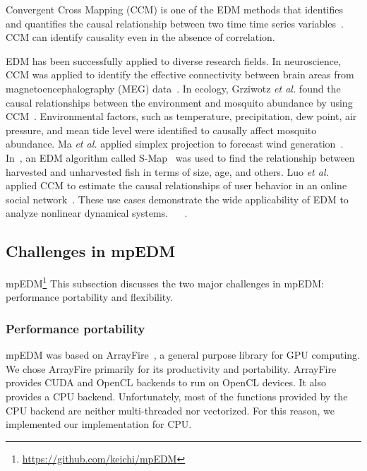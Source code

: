 \documentclass[conference]{IEEEtran}
\begin{document}
Convergent Cross Mapping (CCM) is one of the EDM methods that identifies and
quantifies the causal relationship between two time time series
variables~\cite{Sugihara2012}. CCM can identify causality even in the absence
of correlation.

EDM has been successfully applied to diverse research fields. In neuroscience,
CCM was applied to identify the effective connectivity between brain areas from
magnetoencephalography (MEG) data~\cite{Natsukawa2017}. In ecology, Grziwotz
\emph{et al.} found the causal relationships between the environment and
mosquito abundance by using CCM~\cite{grziwotz2018empirical}. Environmental
factors, such as temperature, precipitation, dew point, air pressure, and mean
tide level were identified to causally affect mosquito abundance. Ma \emph{et
al.} applied simplex projection to forecast wind generation~\cite{ma2017ultra}.
In~\cite{anderson2008fishing}, an EDM algorithm called
S-Map~\cite{sugihara1994nonlinear} was used to find the relationship between
harvested and unharvested fish in terms of size, age, and others. Luo \emph{et
al.} applied CCM to estimate the causal relationships of user behavior in an
online social network~\cite{luo2014causal}. These use cases demonstrate the wide
applicability of EDM to analyze nonlinear dynamical systems.
~\cite{Natsukawa2017,Ma2017,VanBerkel2020}
~\cite{Pu2019,Ma2017}.


\subsection{Challenges in mpEDM}\label{sec:challenges}

mpEDM\footnote{\url{https://github.com/keichi/mpEDM}}
This subsection discusses the two major challenges in mpEDM: performance
portability and flexibility.

\subsubsection{Performance portability}

mpEDM was based on ArrayFire~\cite{Malcolm2012}, a general purpose library for
GPU computing. We chose ArrayFire primarily for its productivity and
portability. ArrayFire provides CUDA and OpenCL backends to run on OpenCL
devices. It also provides a CPU backend. Unfortunately, most of the functions
provided by the CPU backend are neither multi-threaded nor vectorized. For this
reason, we implemented our implementation for CPU\@.
\end{document}
